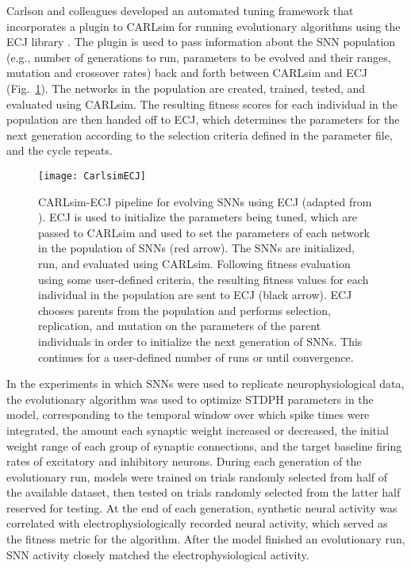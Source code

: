Carlson and colleagues \citep{Carlson2014}
developed an automated tuning framework
that incorporates a plugin to CARLsim \citep{BeyelerCarlsonChou2015}
for running evolutionary algorithms using the ECJ library \citep{white2012}.
The plugin is used to pass information about the \ac{SNN} population
(e.g., number of generations to run, parameters to be evolved and their ranges,
mutation and crossover rates)
back and forth between CARLsim and ECJ (Fig.~\ref{fig:CarlsimECJ}).
The networks in the population are created, trained, tested, and evaluated using CARLsim.
The resulting fitness scores for each individual in the population 
are then handed off to ECJ,
which determines the parameters for the next generation according to
the selection criteria defined in the parameter file,
and the cycle repeats.

\begin{figure}[h]
	\centering
	\texttt{[image: CarlsimECJ]}
    \caption{CARLsim-ECJ pipeline for evolving \acp{SNN} using ECJ
    (adapted from \citep{Carlson2014}).
    ECJ is used to initialize the parameters being tuned, which are passed to CARLsim and used to set the parameters of each network in the population of \acp{SNN} (red arrow). The \acp{SNN} are initialized, run, and evaluated using CARLsim. Following fitness evaluation using some user-defined criteria, the resulting fitness values for each individual in the population are sent to ECJ (black arrow). ECJ chooses parents from the population and performs selection, replication, and mutation on the parameters of the parent individuals in order to initialize the next generation of \acp{SNN}. This continues for a user-defined number of runs or until convergence.}
	\label{fig:CarlsimECJ}
\end{figure}

 In the experiments in which \acp{SNN} were used to replicate neurophysiological data, the evolutionary algorithm was used to optimize STDPH parameters in the model, corresponding to the temporal window over which spike times were integrated, the amount each synaptic weight increased or decreased, the initial weight range of each group of synaptic connections, and the target baseline firing rates of excitatory and inhibitory neurons. During each generation of the evolutionary run, models were trained on trials randomly selected from half of the available dataset, then tested on trials randomly selected from the latter half reserved for testing. At the end of each generation, synthetic neural activity was correlated with electrophysiologically recorded neural activity, which served as the fitness metric for the algorithm. After the model finished an evolutionary run, SNN activity closely matched the electrophysiological activity.
 
 

